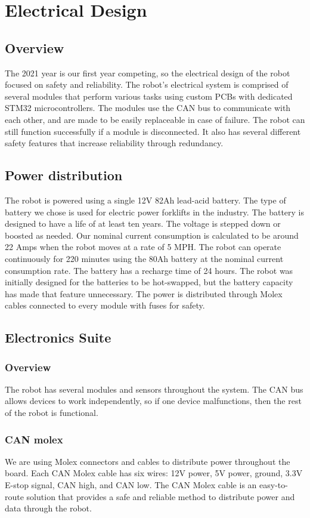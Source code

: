 \section{Electrical Design}
\subsection{Overview}
The 2021 year is our first year competing, so the electrical design of the robot focused on safety and reliability. The robot's electrical system is comprised of several modules that perform various tasks using custom PCBs with dedicated STM32 microcontrollers. The modules use the CAN bus to communicate with each other, and are made to be easily replaceable in case of failure. The robot can still function successfully if a module is disconnected. It also has several different safety features that increase reliability through redundancy.

\subsection{Power distribution}
The robot is powered using a single 12V 82Ah lead-acid battery. The type of battery we chose is used for electric power forklifts in the industry. The battery is designed to have a life of at least ten years. The voltage is stepped down or boosted as needed. Our nominal current consumption is calculated to be around 22 Amps when the robot moves at a rate of 5 MPH. The robot can operate continuously for 220 minutes using the 80Ah battery at the nominal current consumption rate. The battery has a recharge time of 24 hours. The robot was initially designed for the batteries to be hot-swapped, but the battery capacity has made that feature unnecessary. The power is distributed through Molex cables connected to every module with fuses for safety.
\subsection{Electronics Suite}

\subsubsection{Overview}
The robot has several modules and sensors throughout the system. The CAN bus allows devices to work independently, so if one device malfunctions, then the rest of the robot is functional.

\subsubsection{CAN molex}
We are using Molex connectors and cables to distribute power throughout the board. Each CAN Molex cable has six wires: 12V power, 5V power, ground, 3.3V E-stop signal, CAN high, and CAN low. The CAN Molex cable is an easy-to-route solution that provides a safe and reliable method to distribute power and data through the robot.

